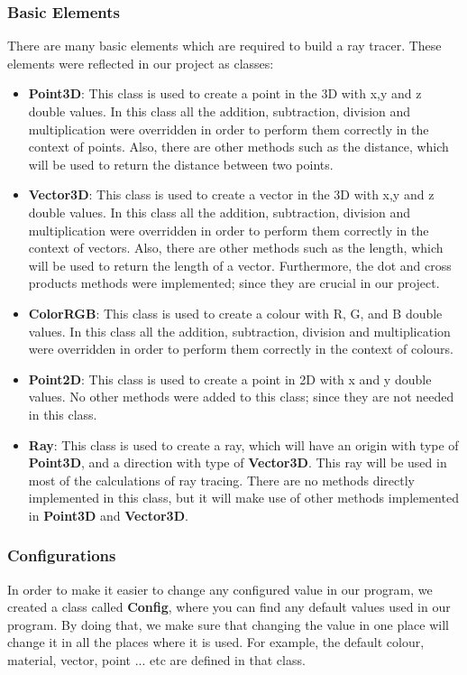 \documentclass[a4paper]{article}
\begin{document}
	\subsubsection{Basic Elements}
	There are many basic elements which are required to build a ray tracer. These elements were reflected in our project as classes: 
	\begin{itemize}
		\item \textbf{Point3D}: This class is used to create a point in the 3D with x,y and z double values. In this class all the addition, subtraction, division and multiplication were overridden in order to perform them correctly in the context of points. Also, there are other methods such as the distance, which will be used to return the distance between two points.
		\item \textbf{Vector3D}: This class is used to create a vector in the 3D with x,y and z double values. In this class all the addition, subtraction, division and multiplication were overridden in order to perform them correctly in the context of vectors. Also, there are other methods such as the length, which will be used to return the length of a vector. Furthermore, the dot and cross products methods were implemented; since they are crucial in our project.
		\item \textbf{ColorRGB}: This class is used to create a colour with R, G, and B double values. In this class all the addition, subtraction, division and multiplication were overridden in order to perform them correctly in the context of colours.
		\item \textbf{Point2D}: This class is used to create a point in 2D with x and y double values. No other methods were added to this class; since they are not needed in this class.
		\item \textbf{Ray}: This class is used to create a ray, which will have an origin with type of \textbf{Point3D}, and a direction with type of \textbf{Vector3D}. This ray will be used in most of the calculations of ray tracing. There are no methods directly implemented in this class, but it will make use of other methods implemented in \textbf{Point3D} and \textbf{Vector3D}.
	\end{itemize}
	\subsubsection{Configurations}
	In order to make it easier to change any configured value in our program, we created a class called \textbf{Config}, where you can find any default values used in our program. By doing that, we make sure that changing the value in one place will change it in all the places where it is used. For example, the default colour, material, vector, point ... etc are defined in that class. 
\end{document}
